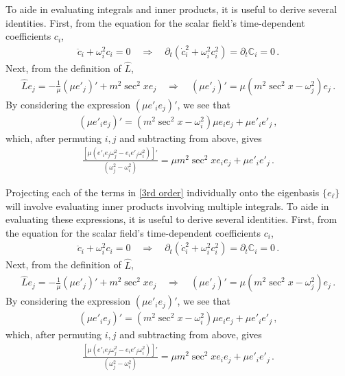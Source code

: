 \documentclass[letterpaper,11pt]{article}
\newcommand{\p}{\partial}
\newcommand{\oi}{\omega_i}
\newcommand{\oj}{\omega_j}
\begin{document}
To aide in evaluating integrals and inner products, it is useful to derive several identities. First, from the equation for the scalar field's time-dependent coefficients $c_i$,
\begin{align} 
\ddot c_i + \oi^2 c_i = 0 \quad \Rightarrow \quad \p_t \left(\dot c_i^2 + \oi^2 c_i^2 \right) = \p_t \mathbb C_i = 0 \, .
\end{align}
Next, from the definition of $\hat L$,
\begin{align}
\hat L e_j = -\frac{1}{\mu} \left( \mu e'_j \right)' + m^2 \sec^2 x e_j \quad \Rightarrow \quad \left( \mu e'_j \right)' = \mu \left( m^2 \sec^2 x - \omega_j^2 \right) e_j \, .
\end{align}
By considering the expression $\left( \mu e'_i e_j \right)'$, we see that
\begin{align}
\left( \mu e'_i e_j \right) ' = \left(m^2 \sec^2 x - \oi^2 \right) \mu e_i e_j + \mu e'_i e'_j \, ,
\end{align}
which, after permuting $i, j$ and subtracting from above, gives
\begin{align}
\frac{\left[ \mu (e'_i e_j \oj^2 - e_i e'_j \oi^2 ) \right]'}{(\oj^2 - \oi^2)} = \mu m^2 \sec^2 x e_i e_j + \mu e'_i e'_j \, .
\end{align}

Projecting each of the terms in \eqref{3rd order} individually onto the eigenbasis $\{ e_\ell \}$ will involve evaluating inner products involving multiple integrals. To aide in evaluating these expressions, it is useful to derive several identities. First, from the equation for the scalar field's time-dependent coefficients $c_i$,
\begin{align} 
\ddot c_i + \oi^2 c_i = 0 \quad \Rightarrow \quad \p_t \left(\dot c_i^2 + \oi^2 c_i^2 \right) = \p_t \mathbb C_i = 0 \, .
\end{align}
Next, from the definition of $\hat L$,
\begin{align}
\hat L e_j = -\frac{1}{\mu} \left( \mu e'_j \right)' + m^2 \sec^2 x e_j \quad \Rightarrow \quad \left( \mu e'_j \right)' = \mu \left( m^2 \sec^2 x - \omega_j^2 \right) e_j \, .
\end{align}
By considering the expression $\left( \mu e'_i e_j \right)'$, we see that
\begin{align}
\left( \mu e'_i e_j \right) ' = \left(m^2 \sec^2 x - \oi^2 \right) \mu e_i e_j + \mu e'_i e'_j \, ,
\end{align}
which, after permuting $i, j$ and subtracting from above, gives
\begin{align}
\frac{\left[ \mu (e'_i e_j \oj^2 - e_i e'_j \oi^2 ) \right]'}{(\oj^2 - \oi^2)} = \mu m^2 \sec^2 x e_i e_j + \mu e'_i e'_j \, .
\end{align}
\end{document}
